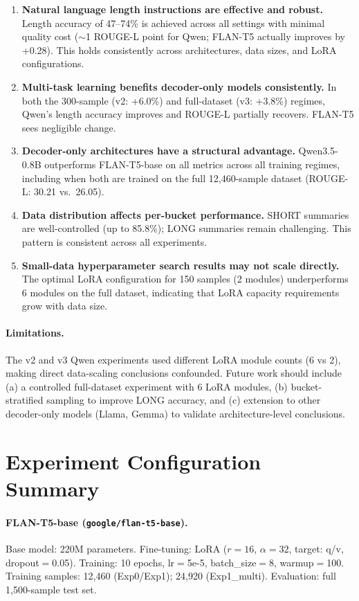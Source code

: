 \documentclass[11pt,a4paper]{article}
\begin{document}
\begin{enumerate}[nosep]
  \item \textbf{Natural language length instructions are effective and robust.} Length accuracy of 47--74\% is achieved across all settings with minimal quality cost (${\sim}$1 ROUGE-L point for Qwen; FLAN-T5 actually improves by +0.28). This holds consistently across architectures, data sizes, and LoRA configurations.
  \item \textbf{Multi-task learning benefits decoder-only models consistently.} In both the 300-sample (v2: +6.0\%) and full-dataset (v3: +3.8\%) regimes, Qwen's length accuracy improves and ROUGE-L partially recovers. FLAN-T5 sees negligible change.
  \item \textbf{Decoder-only architectures have a structural advantage.} Qwen3.5-0.8B outperforms FLAN-T5-base on all metrics across all training regimes, including when both are trained on the full 12,460-sample dataset (ROUGE-L: 30.21 vs.\ 26.05).
  \item \textbf{Data distribution affects per-bucket performance.} SHORT summaries are well-controlled (up to 85.8\%); LONG summaries remain challenging. This pattern is consistent across all experiments.
  \item \textbf{Small-data hyperparameter search results may not scale directly.} The optimal LoRA configuration for 150 samples (2 modules) underperforms 6 modules on the full dataset, indicating that LoRA capacity requirements grow with data size.
\end{enumerate}

\paragraph{Limitations.}
The v2 and v3 Qwen experiments used different LoRA module counts (6 vs 2), making direct data-scaling conclusions confounded.
Future work should include (a) a controlled full-dataset experiment with 6 LoRA modules, (b) bucket-stratified sampling to improve LONG accuracy, and (c) extension to other decoder-only models (Llama, Gemma) to validate architecture-level conclusions.

\appendix
\section{Experiment Configuration Summary}

\paragraph{FLAN-T5-base (\texttt{google/flan-t5-base}).}
Base model: 220M parameters.
Fine-tuning: LoRA ($r{=}16$, $\alpha{=}32$, target: q/v, dropout$=$0.05).
Training: 10 epochs, lr$=$5e-5, batch\_size$=$8, warmup$=$100.
Training samples: 12,460 (Exp0/Exp1); 24,920 (Exp1\_multi).
Evaluation: full 1,500-sample test set.
\end{document}

